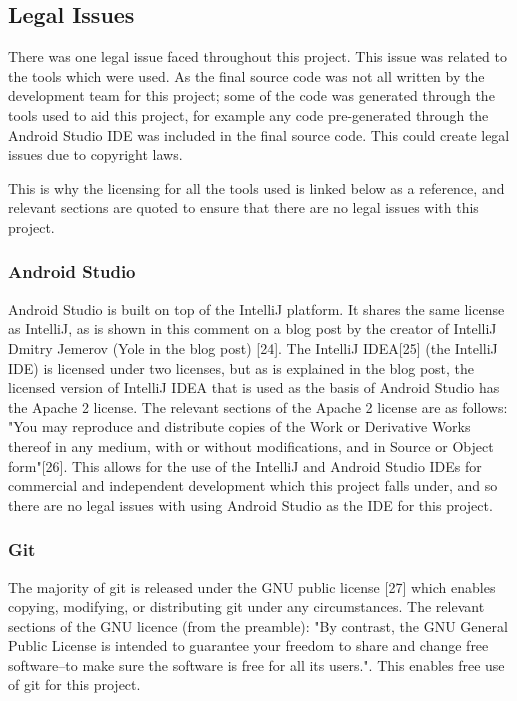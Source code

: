 \documentclass{article}
\begin{document}
\subsection{Legal Issues}

There was one legal issue faced throughout this project. This issue was related to the tools which were used. As the final source code was not all written by the development team for this project; some of the code was generated through the tools used to aid this project, for example any code pre-generated through the Android Studio IDE was included in the final source code. This could create legal issues due to copyright laws. \par

This is why the licensing for all the tools used is linked below as a reference, and relevant sections are quoted to ensure that there are no legal issues with this project. \par

\subsubsection{Android Studio}

Android Studio is built on top of the IntelliJ platform. It shares the same license as IntelliJ, as is shown in this comment on a blog post by the creator of IntelliJ Dmitry Jemerov (Yole in the blog post) [24]. The IntelliJ IDEA[25] (the IntelliJ IDE) is licensed under two licenses, but as is explained in the blog post, the licensed version of IntelliJ IDEA that is used as the basis of Android Studio has the Apache 2 license. The relevant sections of the Apache 2 license are as follows: "You may reproduce and distribute copies of the Work or Derivative Works thereof in any medium, with or without modifications, and in Source or Object form"[26]. This allows for the use of the IntelliJ and Android Studio IDEs for commercial and independent development which this project falls under, and so there are no legal issues with using Android Studio as the IDE for this project. \par

\subsubsection{Git}

The majority of git is released under the GNU public license [27] which enables copying, modifying, or distributing git under any circumstances. The relevant sections of the GNU licence (from the preamble): "By contrast, the GNU General Public License is intended to guarantee your freedom to share and change free software--to make sure the software is free for all its users.". This enables free use of git for this project. \par
\end{document}
